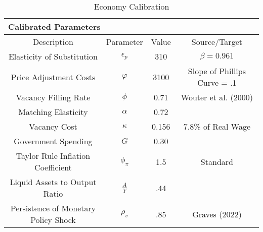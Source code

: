 \begin{table}
\begin{center}\renewcommand{\arraystretch}{1.5}
\caption{Economy Calibration}\label{table:Calibration}
\begin{tabular}{|c|ccl|c|}
\hline
\multicolumn{5}{|l|}{Calibrated Parameters}  \\ \hline
Description                     & \multicolumn{1}{c}{Parameter} & Value & \multicolumn{2}{c|}{Source/Target }\\ \hline
Elasticity of Substitution       & \multicolumn{1}{c}{$\epsilon_{p}$} & 310 & \multicolumn{2}{c|}{$\beta = 0.961$ } \\
Price Adjustment Costs & \multicolumn{1}{c}{$\varphi$} & 3100 & \multicolumn{2}{c|}{Slope of Phillips Curve = .1} \\
Vacancy Filling Rate & \multicolumn{1}{c}{$\phi$} & 0.71 & \multicolumn{2}{c|}{Wouter et al. (2000)} \\
Matching Elasticity & \multicolumn{1}{c}{$\alpha$} & 0.72 & \multicolumn{2}{c|}{\cite{SilvaToledo}} \\
Vacancy Cost & \multicolumn{1}{c}{$\kappa$} & 0.156 & \multicolumn{2}{c|}{7.8\% of Real Wage} \\
 Government Spending       & \multicolumn{1}{c}{$G$} & 0.30 & \multicolumn{2}{c|}{} \\
Taylor Rule Inflation Coefficient        & \multicolumn{1}{c}{$\phi_{\pi}$} & 1.5 & \multicolumn{2}{c|}{Standard} \\
Liquid Assets to Output Ratio       & \multicolumn{1}{c}{$\frac{A}{Y}$} & .44 & \multicolumn{2}{c|}{} \\
Persistence of Monetary Policy Shock      & \multicolumn{1}{c}{$\rho_{v}$} & .85 & \multicolumn{2}{c|}{Graves (2022)} \\ \hline
\end{tabular}
\end{center}
\end{table}